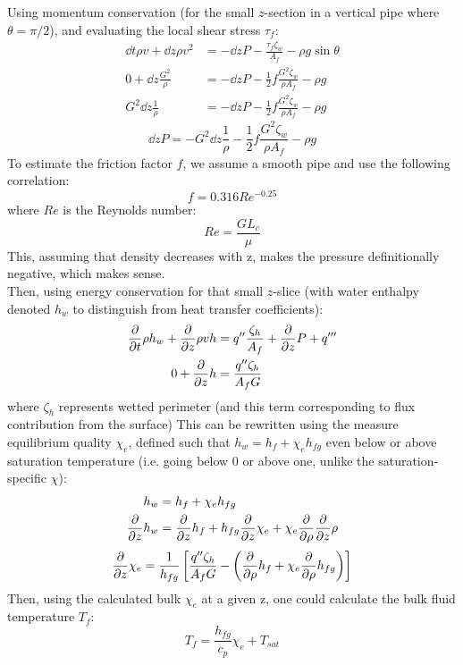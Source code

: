 \documentclass[12pt]{article}
\begin{document}
Using momentum conservation (for the small $z$-section in a vertical pipe where $\theta=\pi/2$), and evaluating the local shear stress $\tau_f$:
\begin{align}
    \dd{t}\rho v + \dd{z}\rho v^2 &= -\dd{z}P - \frac{\tau_f \zeta_w}{A_f} - \rho g\sin{\theta}\\
    0 + \dd{z}\frac{G^2}{\rho} &= -\dd{z}P - \frac{1}{2}f\frac{G^2\zeta_w}{\rho A_f} - \rho g\\
    G^2\dd{z}\frac{1}{\rho} &= -\dd{z}P - \frac{1}{2}f\frac{G^2\zeta_w}{\rho A_f} - \rho g
\end{align}
\begin{equation}
    \label{eq:dpdz}
    \dd{z}P=-G^2\dd{z}\frac{1}{\rho} - \frac{1}{2}f\frac{G^2\zeta_w}{\rho A_f} - \rho g
\end{equation}
To estimate the friction factor $f$, we assume a smooth pipe and use the following correlation\cite{bergman_fundamentals_2017}:
\begin{equation}
    \label{eq:ffactor}
    f = 0.316Re^{-0.25} 
\end{equation}
where $Re$ is the Reynolds number\cite{bergman_fundamentals_2017}:
\begin{equation}
    \label{eq:Re}
    Re = \frac{GL_c}{\mu}
\end{equation}
This, assuming that density decreases with z, makes the pressure definitionally negative, which makes sense.\\

Then, using energy conservation for that small $z$-slice (with water enthalpy denoted $h_w$ to distinguish from heat transfer coefficients):
\begin{align}
    \frac{\partial}{\partial t}\rho h_w + \frac{\partial}{\partial z}\rho vh &= q''\frac{\zeta_h}{A_f} + \frac{\partial}{\partial z} P + q'''\\
    0 + \frac{\partial}{\partial z} h &= \frac{q''\zeta_h}{A_fG}
\end{align}
\newcommand{\chie}{\ensuremath{\chi_e}}
\newcommand{\hfg}{\ensuremath{h_{fg}}}
where $\zeta_h$ represents wetted perimeter (and this term corresponding to flux contribution from the surface)
This can be rewritten using the measure equilibrium quality $\chie$, defined such that $h_w=h_f + \chie h_{fg}$ even below or above saturation temperature (i.e. going below 0 or above one, unlike the saturation-specific $\chi$):
\begin{align}
    h_w &= h_f + \chie h_{fg} \\
    \ddz h_w &= \ddz h_f + \hfg\ddz \chie + \chie\dd{\rho}\ddz\rho\\
\end{align}
\begin{equation}
    \label{eq:dxedz}
    \ddz\chie = \frac{1}{\hfg}\left[\frac{q''\zeta_h}{A_fG} - \left(\dd{\rho}h_f + \chie\dd{\rho}\hfg\right)\right]
\end{equation}
Then, using the calculated bulk $\chie$ at a given z, one could calculate the bulk fluid temperature $T_f$:
\begin{equation}
    \label{eq:Tf}
    T_f = \frac{\hfg}{c_p}\chie + T_{sat}
\end{equation}
\end{document}
